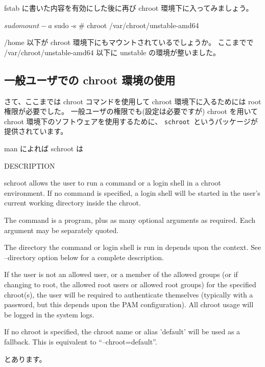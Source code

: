 \documentclass[mingoth,a4paper]{jsarticle}
\begin{document}
fstab に書いた内容を有効にした後に再び chroot 環境下に入ってみましょう。
\begin{commandline}
$ sudo mount -a
$ sudo -s
# chroot /var/chroot/unstable-amd64 
\end{commandline}
/home 以下が chroot 環境下にもマウントされているでしょうか。
ここまでで /var/chroot/unstable-amd64 以下に unstable の環境が整いました。

\subsection{一般ユーザでの chroot 環境の使用}

さて、ここまでは
chroot コマンドを使用して chroot 環境下に入るためには root 権限が必要でした。
一般ユーザの権限でも(設定は必要ですが) chroot を用いて
chroot 環境下のソフトウェアを使用するために、
{\tt schroot }というパッケージが提供されています。

man によれば schroot は
\begin{commandline}
DESCRIPTION

     schroot  allows  the user to run a command or a login shell in a chroot
     environment.  If no command is specified, a login shell will be started
     in the user's current working directory inside the chroot.

     The  command is a program, plus as many optional arguments as required.
     Each argument may be separately quoted.

     The directory the command or login shell is run  in  depends  upon  the
     context.  See --directory option below for a complete description.

     If  the  user is not an allowed user, or a member of the allowed groups
     (or if changing to root, the allowed root users or allowed root groups)
     for  the specified chroot(s), the user will be required to authenticate
     themselves (typically with a password, but this depends  upon  the  PAM
     configuration).  All chroot usage will be logged in the system logs.

     If  no  chroot is specified, the chroot name or alias 'default' will be
     used as a fallback.  This is equivalent to ``--chroot=default''.
\end{commandline}
とあります。
\end{document}
